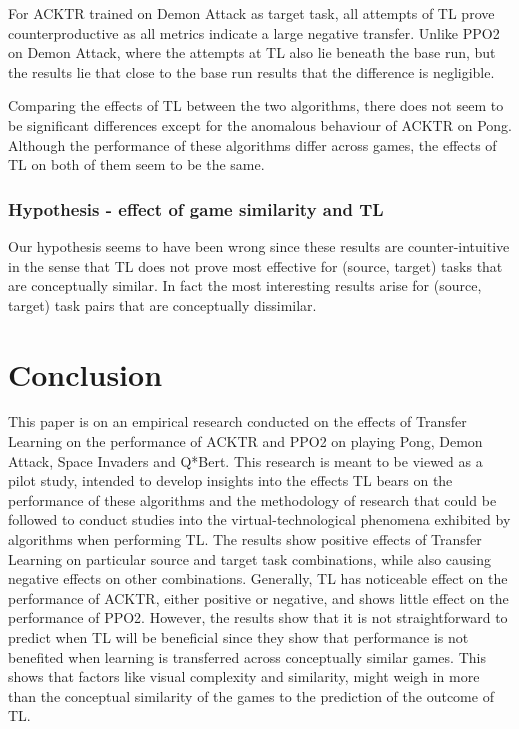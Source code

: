 For ACKTR trained on Demon Attack as target task, all attempts of TL prove counterproductive as all metrics indicate a large negative transfer. Unlike PPO2 on Demon Attack, where the attempts at TL also lie beneath the base run, but the results lie that close to the base run results that the difference is negligible.

Comparing the effects of TL between the two algorithms, there does not seem to be significant differences except for the anomalous behaviour of ACKTR on Pong. Although the performance of these algorithms differ across games, the effects of TL on both of them seem to be the same. 

\subsubsection*{Hypothesis - effect of game similarity and TL}
Our hypothesis seems to have been wrong since these results are counter-intuitive in the sense that TL does not prove most effective for (source, target) tasks that are conceptually similar. In fact the most interesting results arise for (source, target) task pairs that are conceptually dissimilar.

\section{Conclusion}
This paper is on an empirical research conducted on the effects of Transfer Learning on the performance of ACKTR and PPO2 on playing Pong, Demon Attack, Space Invaders and Q*Bert. This research is meant to be viewed as a pilot study, intended to develop insights into the effects TL bears on the performance of these algorithms and the methodology of research that could be followed to conduct studies into the virtual-technological phenomena exhibited by algorithms when performing TL. The results show positive effects of Transfer Learning on particular source and target task combinations, while also causing negative effects on other combinations. Generally, TL has noticeable effect on the performance of ACKTR, either positive or negative, and shows little effect on the performance of PPO2. However, the results show that it is not straightforward to predict when TL will be beneficial since they show that performance is not benefited when learning is transferred across conceptually similar games. This shows that factors like visual complexity and similarity, might weigh in more than the conceptual similarity of the games to the prediction of the outcome of TL.

